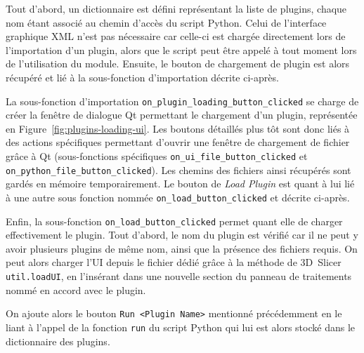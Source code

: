 \documentclass{article}
\begin{document}
{{        Tout d'abord, un dictionnaire est défini représentant la liste de plugins, chaque nom étant associé au chemin d'accès du script Python. Celui de l'interface graphique XML n'est pas nécessaire car celle-ci est chargée directement lors de l'importation d'un plugin, alors que le script peut être appelé à tout moment lors de l'utilisation du module. Ensuite, le bouton de chargement de plugin est alors récupéré et lié à la sous-fonction d'importation décrite ci-après.

        \bigskip

        La sous-fonction d'importation \texttt{on\_plugin\_loading\_button\_clicked} se charge de créer la fenêtre de dialogue Qt permettant le chargement d'un plugin, représentée en Figure~\ref{fig:plugins-loading-ui}. Les boutons détaillés plus tôt sont donc liés à des actions spécifiques permettant d'ouvrir une fenêtre de chargement de fichier grâce à Qt (sous-fonctions spécifiques \texttt{on\_ui\_file\_button\_clicked} et \texttt{on\_python\_file\_button\_clicked}). Les chemins des fichiers ainsi récupérés sont gardés en mémoire temporairement. Le bouton de \textit{Load Plugin} est quant à lui lié à une autre sous fonction nommée \texttt{on\_load\_button\_clicked} et décrite ci-après.

        \bigskip

        Enfin, la sous-fonction \texttt{on\_load\_button\_clicked} permet quant elle de charger effectivement le plugin. Tout d'abord, le nom du plugin est vérifié car il ne peut y avoir plusieurs plugins de même nom, ainsi que la présence des fichiers requis. On peut alors charger l'UI depuis le fichier dédié grâce à la méthode de 3D~Slicer \texttt{util.loadUI}, en l'insérant dans une nouvelle section du panneau de traitements nommé en accord avec le plugin.

        On ajoute alors le bouton \texttt{Run <Plugin Name>} mentionné précédemment en le liant à l'appel de la fonction \texttt{run} du script Python qui lui est alors stocké dans le dictionnaire des plugins.
    }

    \newpage
}
\end{document}
